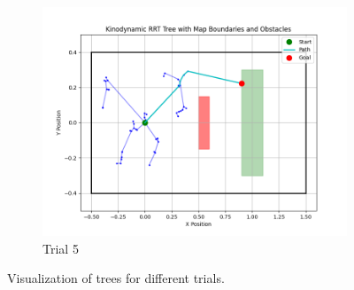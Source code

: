 \documentclass[12pt]{article}
\begin{document}
\begin{figure}[h!]
    \begin{subfigure}{0.45\textwidth}
        \centering
        \includegraphics[width=\textwidth]{./images/tree5.png}
        \caption{Trial 5}
        \label{fig:tree_5}
    \end{subfigure}

    \caption{Visualization of trees for different trials.}
    \label{fig:trials}
\end{figure}
\end{document}
